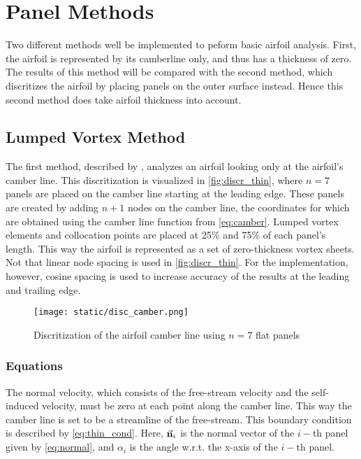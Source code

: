\chapter{Panel Methods}  %
Two different methods well be implemented to peform basic airfoil analysis.
First, the airfoil is represented by its camberline only, and thus has a
thickness of zero. The results of this method will be compared with the second
method, which discritizes the airfoil by placing panels on the outer surface
instead. Hence this second method does take airfoil thickness into account.

\section{Lumped Vortex Method}
\label{sec:thin}
The first method, described by \citeauthor{katz_plotkin}\cite{katz_plotkin}, analyzes an airfoil
looking only at the airfoil's camber line. This discritization is visualized in
\autoref{fig:discr_thin}, where $n=7$ panels are placed on the camber line starting at
the leading edge. These panels are created by adding $n+1$ nodes on the camber
line, the coordinates for which are obtained using the camber line function from
\autoref{eq:camber}. Lumped vortex elements and collocation points are placed at
25\% and 75\% of each panel's length. This way the airfoil is represented as a
set of zero-thickness vortex sheets. Not that linear node spacing is used in
\autoref{fig:discr_thin}. For the implementation, however, cosine spacing is used to
increase accuracy of the results at the leading and trailing edge.


\begin{figure}[H]
\centering
\texttt{[image: static/disc\_camber.png]}
\caption{Discritization of the airfoil camber line using $n=7$ flat panels\cite{katz_plotkin}}
\label{fig:discr_thin}
\end{figure}

\subsection{Equations}
The normal velocity, which consists of the free-stream velocity and the
self-induced velocity, must be zero at each point along the camber line. This
way the camber line is set to be a streamline of the free-stream. This
boundary condition is described by \autoref{eq:thin_cond}. Here,
$\vec{\bf{n}}_i$ is the normal vector of the $i-$th panel given by
\autoref{eq:normal}, and $\alpha_i$ is the angle w.r.t. the x-axis of the $i-$th
panel.

